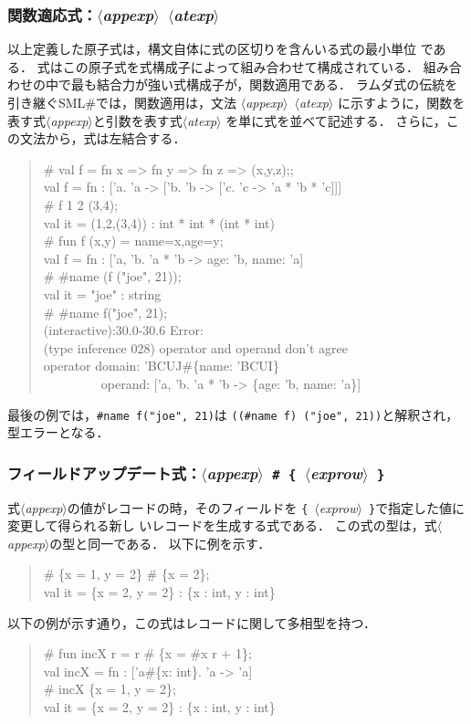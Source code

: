 \documentclass{jbook}
\newcommand{\smlsharp}{SML\#}
\newcommand{\code}[1]{\mbox{\large\tt #1}}
\newcommand{\nonterm}[1]{\mbox{$\langle$}{\it #1}\mbox{$\rangle$}}
\newcommand{\term}[1]{\mbox{{\tt #1}}}
\newcommand{\myem}{\mbox{\ \ }}
\newenvironment{program}{\begin{quote}\begin{tt}}%
                        {\end{tt}\end{quote}}
\begin{document}
\subsubsection{関数適応式：\nonterm{appexp}\ \nonterm{atexp}}

	以上定義した原子式は，構文自体に式の区切りを含んいる式の最小単位
である．
	式はこの原子式を式構成子によって組み合わせて構成されている．
	組み合わせの中で最も結合力が強い式構成子が，関数適用である．
	ラムダ式の伝統を引き継ぐ\smlsharp{}では，関数適用は，文法
\nonterm{appexp}\ \nonterm{atexp}
に示すように，関数を表す式\nonterm{appexp}と引数を表す式\nonterm{atexp}
を単に式を並べて記述する．
	さらに，この文法から，式は左結合する．
\begin{program}
\# val f = fn x => fn y => fn z => (x,y,z);;
\\
val f = fn : ['a. 'a -> ['b. 'b -> ['c. 'c -> 'a * 'b * 'c]]]
\\
\# f 1 2 (3,4);
\\
val it = (1,2,(3,4)) : int * int * (int * int)
\\
\# fun f (x,y) = {name=x,age=y};
\\
val f = fn : ['a, 'b. 'a * 'b -> {age: 'b, name: 'a}]
\\
\# \#name (f ("joe", 21));
\\
val it = "joe" : string
\\
\# \#name f("joe", 21);
\\
(interactive):30.0-30.6 Error:
\\
  (type inference 028) operator and operand don't agree
\\
  operator domain: 'BCUJ\#\{name: 'BCUI\}
\\
\myem\myem\myem\myem\          operand: ['a, 'b. 'a * 'b -> \{age: 'b, name: 'a\}]
\end{program}
	最後の例では，\code{\#name f("joe", 21)}は
\code{((\#name f) ("joe", 21))}と解釈され，型エラーとなる．


\subsubsection{フィールドアップデート式：\nonterm{appexp}\ \term{\#}\ \term{\{}\ \nonterm{exprow}\ \term{\}}}

	式\nonterm{appexp}の値がレコードの時，そのフィールドを
\term{\{}\ \nonterm{exprow}\ \term{\}}で指定した値に変更して得られる新し
いレコードを生成する式である．
	この式の型は，式\nonterm{appexp}の型と同一である．
	以下に例を示す．
\begin{program}
\# \{x = 1, y = 2\} \# \{x = 2\};
\\
val it = \{x = 2, y = 2\} : \{x : int, y : int\}
\end{program}
	以下の例が示す通り，この式はレコードに関して多相型を持つ．
\begin{program}
\# fun incX r = r \# \{x = \#x r + 1\};
\\
val incX = fn : ['a\#\{x: int\}. 'a -> 'a]
\\
\# incX \{x = 1, y = 2\};
\\
val it  = \{x = 2, y = 2\} : \{x : int, y : int\}
\end{program}
\end{document}
